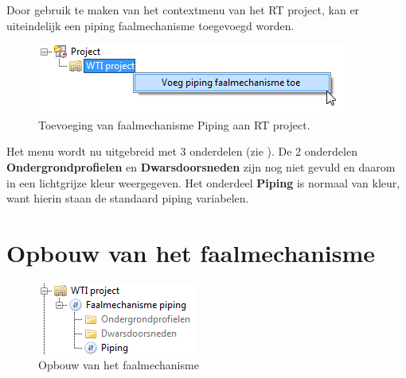 Door gebruik te maken van het contextmenu van het RT project, kan er uiteindelijk een piping faalmechanisme toegevoegd worden.

\begin{figure} [H]
	\centering
		\includegraphics{figures/chapter_piping/addPipingMechanismToProject}
	\caption{Toevoeging van faalmechanisme Piping aan RT project.}
	\label{fig:piping.addPipingMechanismToProject}
\end{figure}

Het menu wordt nu uitgebreid met 3 onderdelen (zie ). De 2 onderdelen \textbf{Ondergrondprofielen} en \textbf{Dwarsdoorsneden} zijn nog niet gevuld en daarom in een lichtgrijze kleur weergegeven. Het onderdeel \textbf{Piping} is normaal van kleur, want hierin staan de standaard piping variabelen.

\section{Opbouw van het faalmechanisme}

\begin{figure} [H]
	\centering
		\includegraphics{figures/chapter_piping/OpbouwFaalmechanisme}
	\caption{Opbouw van het faalmechanisme}
	\label{fig:piping.OpbouwFaalmechanisme}
\end{figure}


